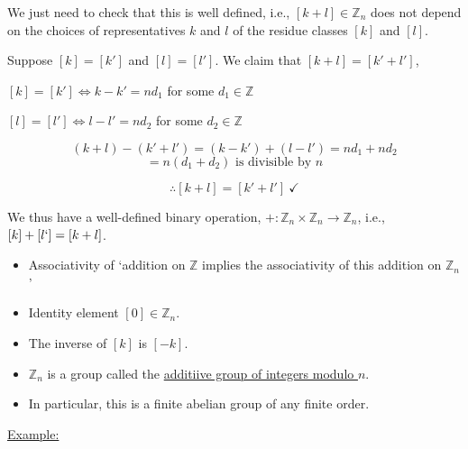 \documentclass{article}
\theoremstyle{definition}
\begin{document}
We just need to check that this is well defined, i.e., $[k+l]\in\mathbb{Z}_n$ does not depend on the choices of representatives $k$ and $l$ of the residue classes $[k]$ and $[l]$.

\noindent Suppose $[k]=[k']$ and $[l]=[l']$. We claim that $[k+l]=[k'+l']$,

$[k]=[k']\Leftrightarrow k-k'=nd_1$ for some $d_1\in\mathbb{Z}$

$[l]=[l']\Leftrightarrow l-l'=nd_2$ for some $d_2\in\mathbb{Z}$

$$(k+l)-(k'+l')=(k-k')+(l-l')=nd_1+nd_2$$
$$=n(d_1+d_2)\text{  is divisible by $n$}$$

$$\therefore [k+l]=[k'+l']\ \checkmark$$

\noindent We thus have a well-defined binary operation, $+:\mathbb{Z}_n\times\mathbb{Z}_n\to\mathbb{Z}_n$, i.e., $[k]+[l`]=[k+l]$.

\begin{itemize}
    \item Associativity of `addition on $\mathbb{Z}$ implies the associativity of this addition on $\mathbb{Z}_n$'
    \item Identity element $[0]\in\mathbb{Z}_n$.
    \item The inverse of $[k]$ is $[-k]$.
    \item $\mathbb{Z}_n$ is a group called the \underline{additiive group of integers modulo $n$}.
    \item In particular, this is a finite abelian group of any finite order.
\end{itemize}

\noindent\underline{Example:}
\end{document}
